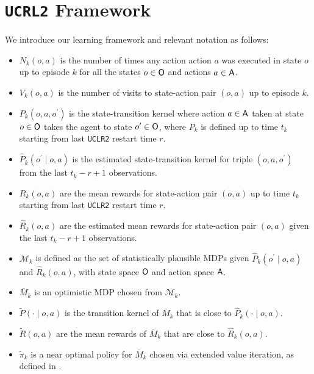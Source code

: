 \documentclass{article} %
\begin{document}
\newpage




\newpage
\appendix
\onecolumn

\appendix

\section{\texttt{UCRL2} Framework}\label{sec::framework}
We introduce our learning framework and relevant notation as follows:
\begin{itemize}
    \item $N_{k}(o, a)$ is the number of times any action action $a$ was executed in state $o$ up to episode $k$ for all the states $o \in {\mathsf{O}}$ and actions $a \in {\mathsf{A}}$. 
    \item  $V_{k}(o, a)$ is the number of visits to state-action pair $(o, a)$ up to episode $k$. 
    \item $P_k\left(o, a, o^{\prime}\right)$ is the state-transition kernel where action $a \in {\mathsf{A}}$ taken at state $o \in {\mathsf{O}}$ takes the agent to state $o^{\prime} \in {\mathsf{O}}$, where $P_k$ is defined up to time $t_k$ starting from last \texttt{UCLR2} restart time $r$. 
    \item $\hat{P}_k\left(o^{\prime} \mid o, a\right)$ is the estimated state-transition kernel for triple $(o, a, o^{\prime})$ from the last $t_k-r+1$ observations. 
    \item $R_k(o, a)$ are the mean rewards for state-action pair $(o, a)$ up to time $t_k$ starting from last \texttt{UCLR2} restart time $r$. 
    \item $\hat{R}_k(o, a)$ are the estimated mean rewards for state-action pair $(o, a)$ given the last $t_k-r+1$ observations.
    \item $\mathcal{M}_k$ is defined as the set of statistically plausible MDPs given $\hat{P}_k\left(o^{\prime} \mid o, a\right)$ and $\hat{R}_k(o, a)$, with state space ${\mathsf{O}}$ and action space ${\mathsf{A}}$. 
    \item $\bar{M}_k$ is an optimistic MDP chosen from $\mathcal{M}_k$.
    \item $\tilde{P}(\cdot \mid o, a)$ is the transition kernel of $\bar{M}_k$ that is close to $\hat{P}_k(\cdot \mid o, a)$.
    \item $\tilde{R}(o, a)$ are the mean rewards of $\bar{M}_k$ that are close to $\hat{R}_k(o, a)$.
    \item $\tilde{\pi}_k$ is a near optimal policy for $\bar{M}_k$ chosen via extended value iteration, as defined in \cite{auer2008near}.
\end{itemize}    
\end{document}
